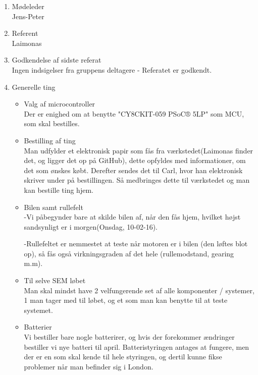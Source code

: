 	\begin{enumerate}
		\itemsep 0.3em 
		\item Mødeleder\\
			Jens-Peter
		\item Referent\\
			Laimonas
		\item Godkendelse af sidste referat\\
			Ingen indsigelser fra gruppens deltagere - Referatet er godkendt. 
			
		\item Generelle ting\\
		\begin{itemize}
			\itemsep 0.3em 
			\item Valg af microcontroller\\
			Der er enighed om at benytte "CY8CKIT-059 PSoC® 5LP" som MCU, som skal bestilles.
			
			\item Bestilling af ting\\
			Man udfylder et elektronisk papir som fås fra værkstedet(Laimonas finder det, og ligger det op på GitHub), dette opfyldes med informationer, om det som ønskes købt. Derefter sendes det til Carl, hvor han elektronisk skriver under på bestillingen. Så medbringes dette til værkstedet og man kan bestille ting hjem.
			
			\item Bilen samt rullefelt\\
			-Vi påbegynder bare at skilde bilen af, når den fås hjem, hvilket højst sandsynligt er i morgen(Onsdag, 10-02-16).
				
			-Rullefeltet er nemmestet at teste når motoren er i bilen (den løftes blot op), så fås også virkningsgraden af det hele (rullemodstand, gearing m.m).
			
			\item Til selve SEM løbet\\
			Man skal mindst have 2 velfungerende set af alle komponenter / systemer, 1 man tager med til løbet, og et som man kan benytte til at teste systemet. 

			\item Batterier\\
			Vi bestiller bare nogle batterirer, og hvis der forekommer ændringer bestiller vi nye batteri til april.
			Batteristyringen antages at fungere, men der er en som skal kende til hele styringen, og dertil kunne fikse problemer når man befinder sig i London. 
			

\end{itemize}
\end{enumerate}
